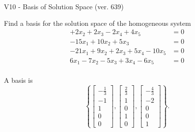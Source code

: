 \begin{exercise}
  \begin{exerciseTitle}V10 - Basis of Solution Space (ver. 639)\end{exerciseTitle}
  \begin{exerciseStatement}
    Find a basis for the solution space of the homogeneous system 
\begin{align*}
 + 2 x_ 2 + 2 x_ 3 -2 x_ 4 + 4 x_ 5 &= 0  \\ 
  -15 x_ 1 + 10 x_ 2 + 5 x_ 3 &= 0  \\ 
  -21 x_ 1 + 9 x_ 2 + 2 x_ 3 + 5 x_ 4 -10 x_ 5 &= 0  \\ 
  6 x_ 1 -7 x_ 2 -5 x_ 3 + 3 x_ 4 -6 x_ 5 &= 0  \\ 
 \end{align*}


 
  \end{exerciseStatement}

  \begin{exerciseAnswer}
   A basis is   
\[\left\{\left[\begin{array}{c}
-\frac{1}{3} \\
-1 \\
1 \\
0 \\
0
\end{array}\right] , \left[\begin{array}{c}
\frac{2}{3} \\
1 \\
0 \\
1 \\
0
\end{array}\right] , \left[\begin{array}{c}
-\frac{4}{3} \\
-2 \\
0 \\
0 \\
1
\end{array}\right]\right\}.\]

  


  \end{exerciseAnswer}
\end{exercise}